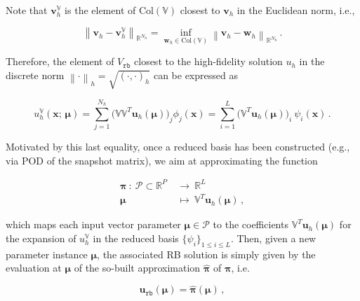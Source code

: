\documentclass[longtitle]{elsarticle}
\numberwithin{equation}{section}
\theoremstyle{theorem}
\theoremstyle{definition}
\theoremstyle{remark}
\theoremstyle{proposition}
\numberwithin{figure}{section}
\newcommand{\norm}[1]{\left\lVert#1\right\rVert}
\newcommand{\bg}[1]{\boldsymbol{#1}}
\begin{document}
		Note that $\mathbf{v}_h^{\mathbb{V}}$ is the element of $\text{Col}(\mathbb{V})$ closest to $\mathbf{v}_h$ in the Euclidean norm, i.e.,
		\begin{linenomath}\begin{equation*}
			\norm{\mathbf{v}_h - \mathbf{v}_h^{\mathbb{V}}}_{\mathbb{R}^{N_h}} = \inf_{\mathbf{w}_h \in \text{Col}(\mathbb{V})} \norm{\mathbf{v}_h - \mathbf{w}_h}_{\mathbb{R}^{N_h}} \, .
		\end{equation*}\end{linenomath}
		Therefore, the element of $V_{\texttt{rb}}$ closest to the high-fidelity solution $u_h$ in the discrete norm $\norm{\cdot}_h = \sqrt{(\cdot,\cdot)_h}$ can be expressed as
		\begin{linenomath}\begin{equation*}
			\label{eq:high-fidelity-projected}
			u^{\mathbb{V}}_h(\bg{x}; \, \bg{\mu}) = \sum_{j = 1}^{N_h} \big( \mathbb{V} \mathbb{V}^T \mathbf{u}_h(\bg{\mu}) \big)_j \phi_j(\bg{x}) = \sum_{i = 1}^L \big( \mathbb{V}^T \mathbf{u}_h(\bg{\mu}) \big)_i ~ \psi_i(\bg{x}) \, .
		\end{equation*}\end{linenomath} 
		Motivated by this last equality, once a reduced basis has been constructed (e.g., via POD of the snapshot matrix), we aim at approximating the function
		\begin{linenomath}\begin{linenomath}\begin{equation}
			\label{eq:map-to-approximate}
			\begin{aligned}
				\bg{\pi} ~ : ~ \mathcal{P} \subset \mathbb{R}^P ~ & \rightarrow ~ \mathbb{R}^L \\
				\bg{\mu} ~~ & \mapsto ~ \mathbb{V}^T \mathbf{u}_h(\bg{\mu}) \, ,
			\end{aligned}
		\end{equation}\end{linenomath}\end{linenomath}
		which maps each input vector parameter $\bg{\mu} \in \mathcal{P}$ to the coefficients $\mathbb{V}^T \mathbf{u}_h(\bg{\mu})$ for the expansion of $u^{\mathbb{V}}_h$ in the reduced basis $\big\lbrace \psi_i \big\rbrace_{1 \leq i \leq L}$. Then, given a new parameter instance $\bg{\mu}$, the associated RB solution is simply given by the evaluation at $\bg{\mu}$ of the so-built approximation $\hat{\bg{\pi}}$ of $\bg{\pi}$, i.e.
		\begin{linenomath}\begin{equation*}
			\mathbf{u}_{\texttt{rb}}(\bg{\mu}) = \hat{\bg{\pi}}(\bg{\mu}) \, ,
		\end{equation*}\end{linenomath}
\end{document}
